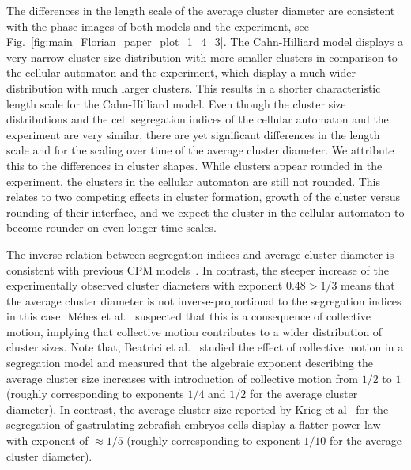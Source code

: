 \documentclass[10pt,letterpaper]{article}
\newcommand{\figref}[1]{Fig.~\ref{fig:#1}}
\begin{document}
The differences in the length scale of the average cluster diameter are
consistent with the phase images of both models and the experiment,
see \figref{main_Florian_paper_plot_1_4_3}. The Cahn-Hilliard model
displays a very narrow cluster size distribution with more smaller clusters
in comparison to the cellular automaton and the experiment, which display a
much wider distribution with much larger clusters. This results in a
shorter characteristic length scale for the Cahn-Hilliard model. Even though
the cluster size distributions and the cell segregation indices of the cellular
automaton and the experiment are very similar, there are yet significant differences
in the length scale and for the scaling over time of the average cluster diameter.
We attribute this to the differences in cluster shapes. While clusters
appear rounded in the experiment, the clusters in the cellular automaton are still
not rounded. This relates to two competing effects in
cluster formation, growth of the cluster versus rounding of their
interface, and we expect the cluster in the cellular automaton to
become rounder on even longer time scales.

The inverse relation between segregation indices and average cluster
diameter is consistent with previous CPM
models~\cite{NakIsh2011,Dur2021}. In contrast, the steeper increase of
the experimentally observed cluster diameters with exponent $0.48>1/3$
means that the average cluster diameter is not inverse-proportional to
the segregation indices in this case. Méhes et
al.~\cite{MehMonNemVic2012} suspected that this is a consequence of
collective motion, implying that collective motion contributes to a
wider distribution of cluster sizes. Note that, Beatrici et
al.~\cite{BeaAlmBru2017} studied the effect of collective motion in a
segregation model and measured that the algebraic exponent describing
the average cluster size increases with introduction of collective
motion from $1/2$ to $1$ (roughly corresponding to exponents $1/4$ and
$1/2$ for the average cluster diameter). In contrast, the average
cluster size reported by Krieg et al~\cite{KriEtal2008} for the
segregation of gastrulating zebrafish embryos cells display a flatter
power law with exponent of $\approx 1/5$ (roughly corresponding to
exponent $1/10$ for the average cluster diameter).
\end{document}
